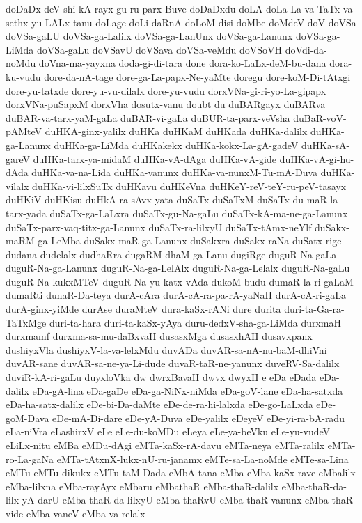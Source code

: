 {doDaDx-deV-shi-kA-rayx-gu-ru-parx-Buve
doDaDxdu
doLA
doLa-La-va-TaTx-va-sethx-yu-LALx-tanu
doLage
doLi-daRnA
doLoM-disi
doMbe
doMdeV
doV
doVSa
doVSa-gaLU
doVSa-ga-Lalilx
doVSa-ga-LanUnx
doVSa-ga-Lanunx
doVSa-ga-LiMda
doVSa-gaLu
doVSavU
doVSava
doVSa-veMdu
doVSoVH
doVdi-da-noMdu
doVna-ma-yayxna
doda-gi-di-tara
done
dora-ko-LaLx-deM-bu-dana
dora-ku-vudu
dore-da-nA-tage
dore-ga-La-papx-Ne-yaMte
doregu
dore-koM-Di-tAtxgi
dore-yu-tatxde
dore-yu-vu-dilalx
dore-yu-vudu
dorxVNa-gi-ri-yo-La-gipapx
dorxVNa-puSapxM
dorxVha
dosutx-vanu
doubt
du
duBARgayx
duBARva
duBAR-va-tarx-yaM-gaLa
duBAR-vi-gaLa
duBUR-ta-parx-veVsha
duBaR-voV-pAMteV
duHKA-ginx-yalilx
duHKa
duHKaM
duHKada
duHKa-dalilx
duHKa-ga-Lanunx
duHKa-ga-LiMda
duHKakekx
duHKa-kokx-La-gA-gadeV
duHKa-sA-gareV
duHKa-tarx-ya-midaM
duHKa-vA-dAga
duHKa-vA-gide
duHKa-vA-gi-hu-dAda
duHKa-va-na-Lida
duHKa-vanunx
duHKa-va-nunxM-Tu-mA-Duva
duHKa-vilalx
duHKa-vi-lilxSuTx
duHKavu
duHKeVna
duHKeY-reV-teY-ru-peV-tasayx
duHKiV
duHKisu
duHkA-ra-sAvx-yata
duSaTx
duSaTxM
duSaTx-du-maR-la-tarx-yada
duSaTx-ga-LaLxra
duSaTx-gu-Na-gaLu
duSaTx-kA-ma-ne-ga-Lanunx
duSaTx-parx-vaq-titx-ga-Lanunx
duSaTx-ra-lilxyU
duSaTx-tAmx-neYlf
duSakx-maRM-ga-LeMba
duSakx-maR-ga-Lanunx
duSakxra
duSakx-raNa
duSatx-rige
dudana
dudelalx
dudhaRra
dugaRM-dhaM-ga-Lanu
dugiRge
duguR-Na-gaLa
duguR-Na-ga-Lanunx
duguR-Na-ga-LelAlx
duguR-Na-ga-Lelalx
duguR-Na-gaLu
duguR-Na-kukxMTeV
duguR-Na-yu-katx-vAda
dukoM-budu
dumaR-la-ri-gaLaM
dumaRti
dunaR-Da-teya
durA-cAra
durA-cA-ra-pa-rA-yaNaH
durA-cA-ri-gaLa
durA-ginx-yiMde
durAse
duraMteV
dura-kaSx-rANi
dure
durita
duri-ta-Ga-ra-TaTxMge
duri-ta-hara
duri-ta-kaSx-yAya
duru-dedxV-sha-ga-LiMda
durxmaH
durxmamf
durxma-sa-mu-daBxvaH
dusasxMga
dusasxhAH
dusavxpanx
dushiyxVla
dushiyxV-la-va-lelxMdu
duvADa
duvAR-sa-nA-nu-baM-dhiVni
duvAR-sane
duvAR-sa-ne-ya-Li-dude
duvaR-taR-ne-yanunx
duveRV-Sa-dalilx
duviR-kA-ri-gaLu
duyxloVka
dw
dwrxBavaH
dwvx
dwyxH
e
eDa
eDada
eDa-dalilx
eDa-gA-lina
eDa-gaDe
eDa-ga-NiNx-niMda
eDa-goV-lane
eDa-ha-satxda
eDa-ha-satx-dalilx
eDe-bi-Da-daMte
eDe-de-ra-hi-lalxda
eDe-go-LaLxda
eDe-goM-Dava
eDe-mA-Di-dare
eDe-yA-Duva
eDe-yalilx
eDeyeV
eDe-yi-ra-bA-radu
eLa-niVra
eLashirxV
eLe
eLe-du-koMDu
eLeya
eLe-ya-beVku
eLe-yu-vudeV
eLiLx-nitu
eMBa
eMDu-dAgi
eMTa-kaSx-rA-davu
eMTa-neya
eMTa-ralilx
eMTa-ro-La-gaNa
eMTa-tAtxnX-lukx-nU-ru-janamx
eMTe-sa-La-noMde
eMTe-sa-Lina
eMTu
eMTu-dikukx
eMTu-taM-Dada
eMbA-tana
eMba
eMba-kaSx-rave
eMbalilx
eMba-lilxna
eMba-rayAyx
eMbaru
eMbathaR
eMba-thaR-dalilx
eMba-thaR-da-lilx-yA-darU
eMba-thaR-da-lilxyU
eMba-thaRvU
eMba-thaR-vanunx
eMba-thaR-vide
eMba-vaneV
eMba-va-relalx
}

